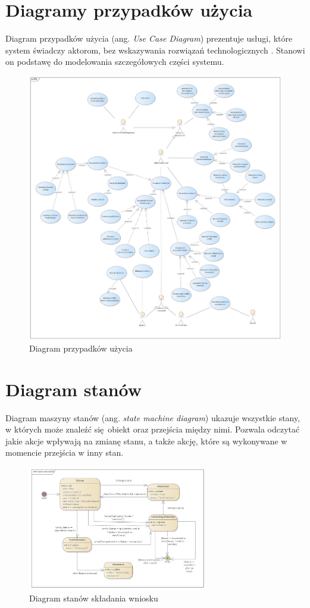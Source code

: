 \section{Diagramy przypadków użycia}
Diagram przypadków użycia (ang. \textit{Use Case Diagram}) prezentuje usługi, które system świadczy aktorom, bez wskazywania rozwiązań technologicznych \cite{UML1}. Stanowi on podstawę do modelowania szczegółowych części systemu.
\begin{figure}[H]
	\centering
	\includegraphics[width=1\textwidth]{images/DPU.jpg}
	\caption{Diagram przypadków użycia}
	\label{fig:UseCase}
\end{figure}
\section{Diagram stanów}
Diagram maszyny stanów (ang. \textit{state machine diagram}) ukazuje wszystkie stany, w których może znaleźć się obiekt oraz przejścia między nimi. Pozwala odczytać jakie akcje wpływają na zmianę stanu, a także akcję, które są wykonywane w momencie przejścia w inny stan.
\begin{figure}[H]
	\centering
	\includegraphics[width=0.7\textwidth]{images/Wniosek.jpg}
	\caption{Diagram stanów składania wniosku}
	\label{fig:StateMachine}
\end{figure}
